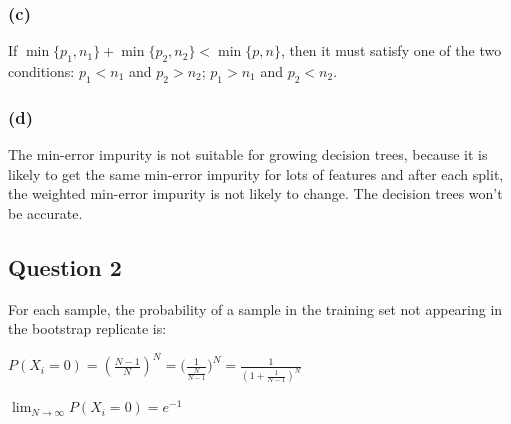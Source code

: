 \documentclass[12pt]{article}
\begin{document}
{%
%
%
%
%

\subsubsection*{(c)}
If $\min\{p_1, n_1\} + \min\{p_2, n_2\} < \min\{p, n\}$,
then it must satisfy one of the two conditions: 
$p_1 < n_1$ and $p_2 > n_2$;
$p_1 > n_1$ and $p_2 < n_2$.

\subsubsection*{(d)}
The min-error impurity is not suitable for growing decision trees, because it is likely to get the same min-error impurity for lots of features and after each split, the weighted min-error impurity is not likely to change. The decision trees won't be accurate.

\subsection*{Question 2}

For each sample, the probability of a sample in the training set not appearing in the bootstrap replicate is: 
\begin{center}
$P(X_{i}=0) =(\frac{N-1}{N})^N  = {(\frac{1}{\frac{N}{N-1}}})^{N}= \frac{1}{  ({1 + \frac{1}{N-1}} )^{N} }$
\end{center}

\begin{center}
$ \lim_{N\to\infty} P(X_{i}=0) = e^{-1}$
\end{center}

}
\end{document}
